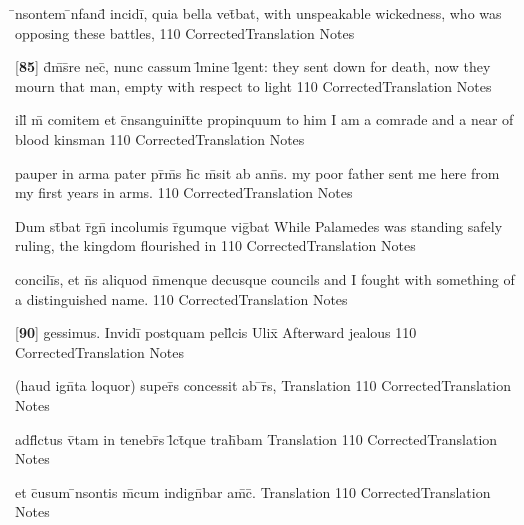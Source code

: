 \latline
  {\={\macron {\i}}nsontem \={\macron {\i}}nfand\={} incidi\={}, quia bella vet\={}bat,}
  { with unspeakable wickedness, who was opposing these battles, }
  {110}
  { CorrectedTranslation }
  { Notes }


\latline
  {[\textbf{85}] d\={}m\={\macron {\i}}s\={}re nec\={\macron {\i}}, nunc cassum l\={}mine l\={}gent:}
  { they sent down for death, now they mourn that man, empty with respect to light }
  {110}
  { CorrectedTranslation }
  { Notes }


\latline
  {ill\={\macron {\i}} m\={} comitem et c\={}nsanguinit\={}te propinquum}
  { to him I am a comrade and a near of blood kinsman }
  {110}
  { CorrectedTranslation }
  { Notes }


\latline
  {pauper in arma pater pr\={\macron {\i}}m\={\macron {\i}}s h\={}c m\={\macron {\i}}sit ab ann\={\macron {\i}}s.}
  { my poor father sent me here from my first years in arms. }
  {110}
  { CorrectedTranslation }
  { Notes }


\latline
  {Dum st\={}bat r\={}gn\={} incolumis r\={}gumque vig\={}bat}
  { While Palamedes was standing safely ruling, the kingdom flourished in }
  {110}
  { CorrectedTranslation }
  { Notes }


\latline
  {concili\={\macron {\i}}s, et n\={}s aliquod n\={}menque decusque}
  { councils and I fought with something of a distinguished name. }
  {110}
  { CorrectedTranslation }
  { Notes }


\latline
  {[\textbf{90}] gessimus.  Invidi\={} postquam pell\={}cis Ulix\={\macron {\i}}}
  { Afterward jealous }
  {110}
  { CorrectedTranslation }
  { Notes }


\latline
  {(haud ign\={}ta loquor) super\={\macron {\i}}s concessit ab \={}r\={\macron {\i}}s,}
  { Translation }
  {110}
  { CorrectedTranslation }
  { Notes }


\latline
  {adfl\={\macron {\i}}ctus v\={\macron {\i}}tam in tenebr\={\macron {\i}}s l\={}ct\={}que trah\={}bam}
  { Translation }
  {110}
  { CorrectedTranslation }
  { Notes }


\latline
  {et c\={}usum \={\macron {\i}}nsontis m\={}cum indign\={}bar am\={\macron {\i}}c\={\macron {\i}}.}
  { Translation }
  {110}
  { CorrectedTranslation }
  { Notes }


